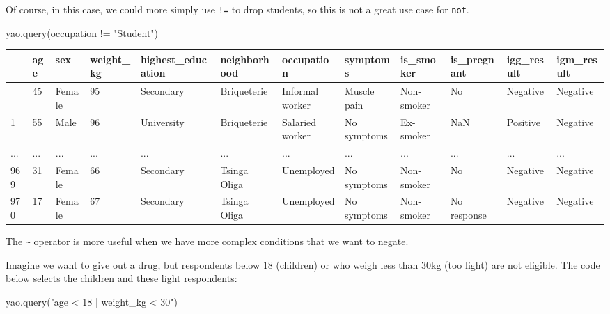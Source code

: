 \documentclass[
  letterpaper,
  DIV=11,
  numbers=noendperiod]{scrreprt}
\newenvironment{Shaded}{\begin{snugshade}}{\end{snugshade}}
\newcommand{\NormalTok}[1]{\textcolor[rgb]{0.00,0.23,0.31}{#1}}
\newcommand{\StringTok}[1]{\textcolor[rgb]{0.13,0.47,0.30}{#1}}
\begin{document}
Of course, in this case, we could more simply use \texttt{!=} to drop
students, so this is not a great use case for \texttt{not}.

\begin{Shaded}
\begin{Highlighting}[]
\NormalTok{yao.query(}\StringTok{\textquotesingle{}occupation != "Student"\textquotesingle{}}\NormalTok{)}
\end{Highlighting}
\end{Shaded}

\begin{longtable}[]{@{}llllllllllll@{}}
\toprule\noalign{}
& age & sex & weight\_kg & highest\_education & neighborhood &
occupation & symptoms & is\_smoker & is\_pregnant & igg\_result &
igm\_result \\
\midrule\noalign{}
\endhead
\bottomrule\noalign{}
\endlastfoot
0 & 45 & Female & 95 & Secondary & Briqueterie & Informal worker &
Muscle pain & Non-smoker & No & Negative & Negative \\
1 & 55 & Male & 96 & University & Briqueterie & Salaried worker & No
symptoms & Ex-smoker & NaN & Positive & Negative \\
... & ... & ... & ... & ... & ... & ... & ... & ... & ... & ... & ... \\
969 & 31 & Female & 66 & Secondary & Tsinga Oliga & Unemployed & No
symptoms & Non-smoker & No & Negative & Negative \\
970 & 17 & Female & 67 & Secondary & Tsinga Oliga & Unemployed & No
symptoms & Non-smoker & No response & Negative & Negative \\
\end{longtable}

The \texttt{\textasciitilde{}} operator is more useful when we have more
complex conditions that we want to negate.

Imagine we want to give out a drug, but respondents below 18 (children)
or who weigh less than 30kg (too light) are not eligible. The code below
selects the children and these light respondents:

\begin{Shaded}
\begin{Highlighting}[]
\NormalTok{yao.query(}\StringTok{"age \textless{} 18 | weight\_kg \textless{} 30"}\NormalTok{)}
\end{Highlighting}
\end{Shaded}
\end{document}
